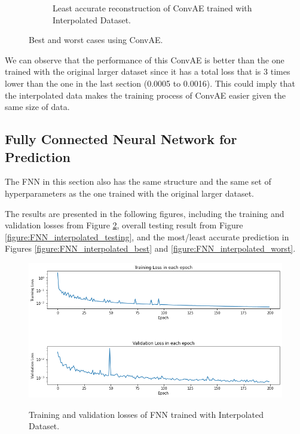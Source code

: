 \begin{figure}[H]
\begin{subfigure}{0.45\textwidth}
    \caption{Least accurate reconstruction of ConvAE trained with Interpolated Dataset.}
\end{subfigure}
\caption{Best and worst cases using ConvAE.}
\label{figure:ConvAE_interpolated_best_worst}
\end{figure}

We can observe that the performance of this ConvAE is better than the one trained with the original larger dataset since it has a total loss that is 3 times lower than the one in the last section (0.0005 to 0.0016). This could imply that the interpolated data makes the training process of ConvAE easier given the same size of data. 


\subsection{Fully Connected Neural Network for Prediction}

The FNN in this section also has the same structure and the same set of hyperparameters as the one trained with the original larger dataset.

The results are presented in the following figures, including the training and validation losses from Figure \ref{figure:FNN_interpolated_losses}, overall testing result from Figure \ref{figure:FNN_interpolated_testing}, and the most/least accurate prediction in Figures \ref{figure:FNN_interpolated_best} and \ref{figure:FNN_interpolated_worst}.

\begin{figure}[H]
    \caption{Training and validation losses of FNN trained with Interpolated Dataset.}
    \includegraphics[scale=0.6]{figures/mantle_convection_images/larger_dataset_interpolated/FNN_trainingData.png}
    \label{figure:FNN_interpolated_losses}
\end{figure}

